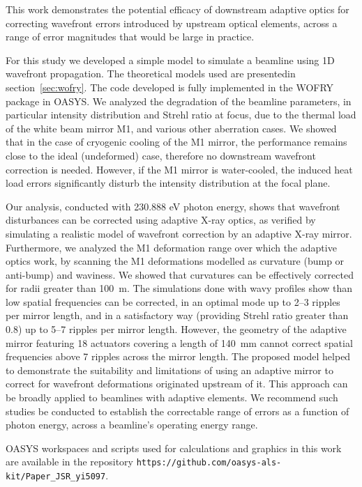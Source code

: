 \documentclass{iucr}
\newcommand{\inblue}[1]{{\color{black}#1}}
\begin{document}
This work demonstrates the potential efficacy of downstream adaptive optics for correcting wavefront errors introduced by upstream optical elements, across a range of error magnitudes that would be large in practice.

For this study we developed a simple model to simulate a beamline using 1D wavefront propagation. The theoretical models used are presentedin section~\ref{sec:wofry}. The code developed is fully implemented in the WOFRY package in OASYS. We analyzed the degradation of the beamline parameters, in particular intensity distribution and Strehl ratio at focus, due to the thermal load of the white beam mirror M1, and various other aberration cases. We showed that in the case of cryogenic cooling of the M1 mirror, the performance remains close to the ideal (undeformed) case, therefore no downstream wavefront correction is needed. However, if the M1 mirror is water-cooled, the induced heat load errors significantly disturb the intensity distribution at the focal plane.

Our analysis, conducted with 230.888 eV photon energy, shows that wavefront disturbances can be corrected using adaptive X-ray optics, as verified by simulating a realistic model of wavefront correction by an adaptive X-ray mirror. Furthermore, we analyzed the M1 deformation range over which the adaptive optics work, by scanning the M1 deformations modelled as curvature (bump or anti-bump) and waviness. We showed that curvatures can be effectively corrected for radii greater than 100~m. The simulations done with wavy profiles show than low spatial frequencies can be corrected, in an optimal mode up to 2--3 ripples per mirror length, and in a satisfactory way (providing Strehl ratio greater than 0.8) up to 5--7 ripples per mirror length. However, the geometry of the adaptive mirror featuring 18 actuators covering a length of 140~mm cannot correct spatial frequencies above 7 ripples across the mirror length. The proposed model helped to demonstrate the suitability and limitations of using an adaptive mirror to correct for wavefront deformations originated upstream of it. This approach can be broadly applied to beamlines with adaptive elements. We recommend such studies be conducted to establish the correctable range of errors as a function of photon energy, across a beamline's operating energy range.

\inblue{OASYS workspaces and scripts used for calculations and graphics in this work are available in the repository {\tt https://github.com/oasys-als-kit/Paper\_JSR\_yi5097}.}
\end{document}

